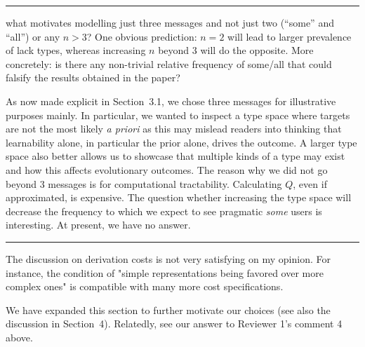 \documentclass[12pt,a4paper]{article}
\begin{document}
%
\noindent\rule{\textwidth}{1pt}

\begin{mdframed}[backgroundcolor=gray!25,linecolor=gray!25,frametitle= Reviewer \thereviewerCounter~comment \thereviewerCommentCounter \hfill ~~({\it message amount})]
%
what motivates modelling just three messages and not just two (``some'' and ``all'') or any $n>3$? One obvious prediction: $n=2$ will lead to larger prevalence of lack types, whereas increasing $n$ beyond $3$ will do the opposite. More concretely: is there any non-trivial relative frequency of some/all that could falsify the results obtained in the paper?

%
\end{mdframed}

As now made explicit in Section~3.1, we chose three messages for illustrative purposes mainly. In particular, we wanted to inspect a type space where targets are not the most likely {\em a priori} as this may mislead readers into thinking that learnability alone, in particular the prior alone, drives the outcome. A larger type space also better allows us to showcase that multiple kinds of a type may exist and how this affects evolutionary outcomes. The reason why we did not go beyond $3$ messages is for computational tractability. Calculating $Q$, even if approximated, is expensive. The question whether increasing the type space will decrease the frequency to which we expect to see pragmatic {\em some} users is interesting. At present, we have no answer. 



\noindent\rule{\textwidth}{1pt}

\begin{mdframed}[backgroundcolor=gray!25,linecolor=gray!25,frametitle= Reviewer \thereviewerCounter~comment \thereviewerCommentCounter \hfill ~~({\it LOT \& complexity})]
%
The discussion on derivation costs is not very satisfying on my opinion. For instance, the condition of "simple representations being favored over more complex ones" is compatible with many more cost specifications.

%
\end{mdframed}

We have expanded this section to further motivate our choices (see also the discussion in Section~4). Relatedly, see our answer to Reviewer 1's comment 4 above.

%
%
%
%
%





\end{document}
